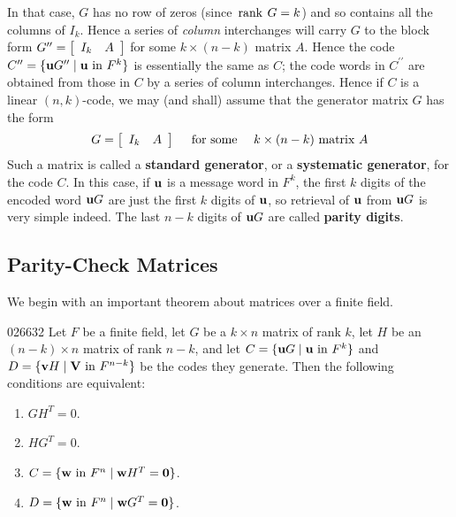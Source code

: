 In that case, $G$ has no row of zeros (since $\thinspace\operatorname{rank\medspace} G = k$) and so contains all the columns of $I_{k}$. Hence a series of \textit{column} interchanges will carry $G$ to the block form $G^{\prime\prime} = \left[\begin{array}{cc}
I_{k} & A 
\end{array}\right]$ for some $k \times (n - k)$ matrix $A$. Hence the code $C^{\prime\prime} = \{\textbf{u}G^{\prime\prime} \mid \textbf{u} \mbox{ in } F^k\}$ is essentially the same as $C$; the code words in $C^{\prime\prime}$ are obtained from those in $C$ by a series of column interchanges. Hence if $C$ is a linear $(n, k)$-code, we may (and shall) assume that the generator matrix $G$ has the form
\begin{equation*}
G = \left[\begin{array}{cc}
I_{k} & A 
\end{array}\right] \quad \mbox{ for some } \quad k \times (n - k) \mbox{ matrix } A
\end{equation*}
Such a matrix is called a \textbf{standard generator}, or a \textbf{systematic generator}, for the code $C$. In this case, if $\textbf{u}$ is a message word in $F^{k}$, the first $k$ digits of the encoded word $\textbf{u}G$ are just the first $k$ digits of $\textbf{u}$, so retrieval of $\textbf{u}$ from $\textbf{u}G$ is very simple indeed. The last $n - k$ digits of $\textbf{u}G$ are called \textbf{parity digits}.

\subsection*{Parity-Check Matrices}

We begin with an important theorem about matrices over a finite field.

\begin{theorem}{}{026632}
Let $F$ be a finite field, let $G$ be a $k \times n$ matrix of rank $k$, let $H$ be an $(n - k) \times n$ matrix of rank $n - k$, and let $C = \{\textbf{u}G \mid \textbf{u} \mbox{ in } F^{k}\}$ and $D = \{\textbf{v}H \mid \textbf{V} \mbox{ in } F^{n-k}\}$ be the codes they generate. Then the following conditions are equivalent:

\begin{enumerate}
\item $GH^{T} = 0$.

\item $HG^{T} = 0$.

\item $C = \{\textbf{w} \mbox{ in } F^{n} \mid \textbf{w}H^{T} = \textbf{0}\}$.

\item $D = \{\textbf{w} \mbox{ in } F^{n} \mid \textbf{w}G^{T} = \textbf{0}\}$.

\end{enumerate}
\end{theorem}

